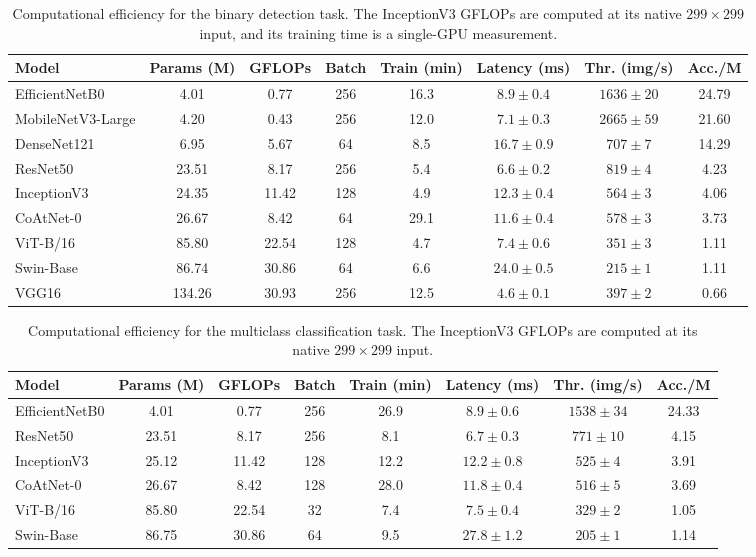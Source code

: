 \documentclass[11pt]{article}
\newcommand{\tablenumber}[1]{\setcounter{table}{\numexpr#1-1\relax}}
\begin{document}
\begin{table}[htbp]
\tablenumber{9}
\centering
\caption{Computational efficiency for the binary detection task. The InceptionV3 GFLOPs are computed at its native $299\times 299$ input, and its training time is a single-GPU measurement.}
\label{tab:s9}
\small
\begin{tabular*}{\textwidth}{@{\extracolsep{\fill}}lccccccc@{}}
\toprule
Model & Params (M) & GFLOPs & Batch & Train (min) & Latency (ms) & Thr. (img/s) & Acc./M \\
\midrule
EfficientNetB0 & 4.01 & 0.77 & 256 & 16.3 & $8.9\pm 0.4$ & $1636\pm 20$ & 24.79 \\
MobileNetV3-Large & 4.20 & 0.43 & 256 & 12.0 & $7.1\pm 0.3$ & $2665\pm 59$ & 21.60 \\
DenseNet121 & 6.95 & 5.67 & 64 & 8.5 & $16.7\pm 0.9$ & $707\pm 7$ & 14.29 \\
ResNet50 & 23.51 & 8.17 & 256 & 5.4 & $6.6\pm 0.2$ & $819\pm 4$ & 4.23 \\
InceptionV3 & 24.35 & 11.42 & 128 & 4.9 & $12.3\pm 0.4$ & $564\pm 3$ & 4.06 \\
CoAtNet-0 & 26.67 & 8.42 & 64 & 29.1 & $11.6\pm 0.4$ & $578\pm 3$ & 3.73 \\
ViT-B/16 & 85.80 & 22.54 & 128 & 4.7 & $7.4\pm 0.6$ & $351\pm 3$ & 1.11 \\
Swin-Base & 86.74 & 30.86 & 64 & 6.6 & $24.0\pm 0.5$ & $215\pm 1$ & 1.11 \\
VGG16 & 134.26 & 30.93 & 256 & 12.5 & $4.6\pm 0.1$ & $397\pm 2$ & 0.66 \\
\bottomrule
\end{tabular*}
\end{table}

\begin{table}[htbp]
\tablenumber{10}
\centering
\caption{Computational efficiency for the multiclass classification task. The InceptionV3 GFLOPs are computed at its native $299\times 299$ input.}
\label{tab:s10}
\small
\begin{tabular*}{\textwidth}{@{\extracolsep{\fill}}lccccccc@{}}
\toprule
Model & Params (M) & GFLOPs & Batch & Train (min) & Latency (ms) & Thr. (img/s) & Acc./M \\
\midrule
EfficientNetB0 & 4.01 & 0.77 & 256 & 26.9 & $8.9\pm 0.6$ & $1538\pm 34$ & 24.33 \\
ResNet50 & 23.51 & 8.17 & 256 & 8.1 & $6.7\pm 0.3$ & $771\pm 10$ & 4.15 \\
InceptionV3 & 25.12 & 11.42 & 128 & 12.2 & $12.2\pm 0.8$ & $525\pm 4$ & 3.91 \\
CoAtNet-0 & 26.67 & 8.42 & 128 & 28.0 & $11.8\pm 0.4$ & $516\pm 5$ & 3.69 \\
ViT-B/16 & 85.80 & 22.54 & 32 & 7.4 & $7.5\pm 0.4$ & $329\pm 2$ & 1.05 \\
Swin-Base & 86.75 & 30.86 & 64 & 9.5 & $27.8\pm 1.2$ & $205\pm 1$ & 1.14 \\
\bottomrule
\end{tabular*}
\end{table}
\end{document}
